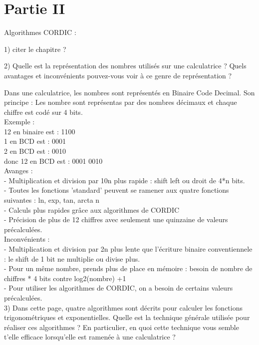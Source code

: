 \documentclass{article}
\begin{document}
\section*{Partie II}

Algorithmes CORDIC :


1) citer le chapitre ?

2) Quelle est la représentation des nombres utilisés sur une calculatrice ? Quels avantages et inconvénients pouvez-vous voir à ce genre de représentation ?

Dans une calculatrice, les nombres sont représentés en Binaire Code Decimal. Son principe : Les nombre sont représentas par des nombres décimaux et chaque chiffre est codé sur 4 bits.\\
Exemple :\\
12 en binaire est : 1100\\
1 en BCD est : 0001\\
2 en BCD est : 0010\\
donc 12 en BCD est : 0001 0010\\

Avanges :\\
- Multiplication et division par 10n plus rapide : shift left ou droit de 4*n bits.\\
- Toutes les fonctions 'standard' peuvent se ramener aux quatre fonctions suivantes :  ln, exp, tan, arcta n\\
- Calculs plus rapides grâce aux algorithmes de CORDIC\\
- Précision de plus de 12 chiffres avec seulement une quinzaine de valeurs précalculées.\\

Inconvénients :\\
- Multiplication et division par 2n plus lente que l'écriture binaire conventiennele : le shift de 1 bit ne multiplie ou divise plus.\\
- Pour un même nombre, prends plus de place en mémoire : besoin de nombre de chiffres * 4 bits contre log2(nombre) +1\\
- Pour utiliser les algorithmes de CORDIC, on a besoin de certains valeurs précalculées.\\

3) Dans cette page, quatre algorithmes sont décrits pour calculer les fonctions trigonométriques et exponentielles. Quelle est la technique générale utilisée pour réaliser ces algorithmes ? En particulier, en quoi cette technique vous semble t’elle efficace lorsqu’elle est ramenée à une calculatrice ?\\
\end{document}
